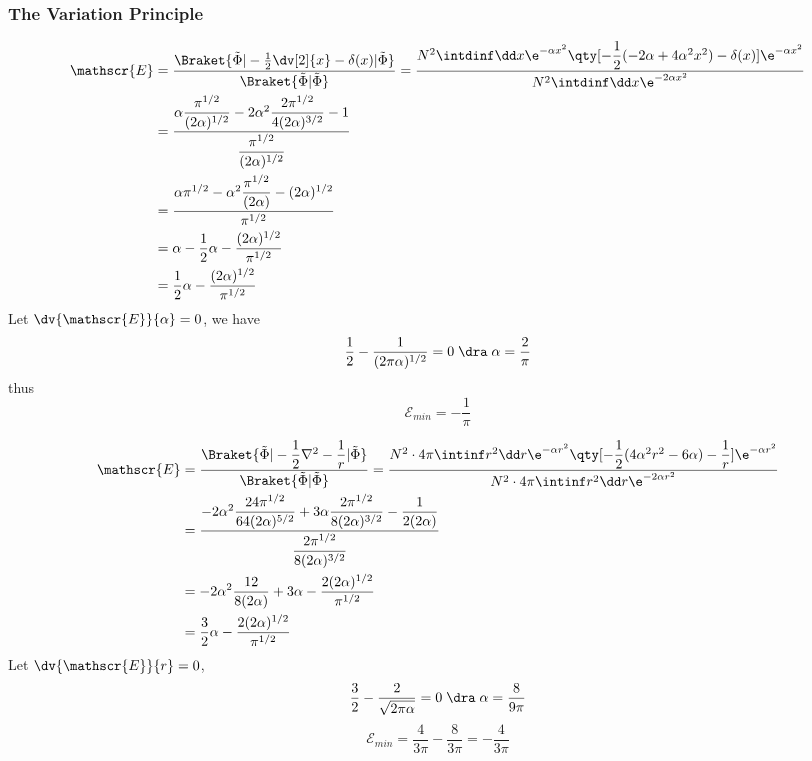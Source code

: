 \documentclass[a4paper]{article}
\begin{document}
\subsubsection{The Variation Principle}
\begin{equation}\label{key}
\begin{aligned}
\mathscr{E} &= \dfrac{\Braket{\tilde{\Phi} | -\tfrac{1}{2}\dv[2]{x}-\delta(x) | \tilde{\Phi}}}{\Braket{\tilde{\Phi} | \tilde{\Phi}}} = \dfrac{N^2 \intdinf\dd x \e^{-\alpha x^2}\qty[-\dfrac{1}{2}(-2\alpha+4\alpha^2 x^2) - \delta(x)]\e^{-\alpha x^2}}{N^2\intdinf\dd x \e^{-2\alpha x^2}}\\
&= \dfrac{\alpha\dfrac{\pi^{1/2}}{(2\alpha)^{1/2}} - 2\alpha^2\dfrac{2\pi^{1/2}}{4(2\alpha)^{3/2}} - 1}{\dfrac{\pi^{1/2}}{(2\alpha)^{1/2}}}\\
&= \dfrac{\alpha \pi^{1/2} - \alpha^2\dfrac{\pi^{1/2}}{(2\alpha)} - (2\alpha)^{1/2}}{\pi^{1/2}}\\
&= \alpha - \dfrac{1}{2}\alpha - \dfrac{(2\alpha)^{1/2}}{\pi^{1/2}}\\
&= \dfrac{1}{2}\alpha - \dfrac{(2\alpha)^{1/2}}{\pi^{1/2}}
\end{aligned}
\end{equation}
Let $ \dv{\mathscr{E}}{\alpha} = 0 $, we have
\begin{equation}\label{key}
\dfrac{1}{2} - \dfrac{1}{(2\pi\alpha)^{1/2}} = 0 \;\dra\; \alpha = \dfrac{2}{\pi}
\end{equation}
thus
\begin{equation}\label{key}
\mathscr{E}_{min} = -\dfrac{1}{\pi}
\end{equation}

\begin{equation}\label{key}
\begin{aligned}
\mathscr{E} &= \dfrac{\Braket{\tilde{\Phi} | -\dfrac{1}{2}\nabla^2 - \dfrac{1}{r} | \tilde{\Phi}}}{\Braket{\tilde{\Phi} | \tilde{\Phi}}} = \dfrac{N^2 \cdot 4\pi \intinf r^2\dd r \e^{-\alpha r^2}\qty[-\dfrac{1}{2}(4 \alpha^2 r^2 - 6\alpha ) - \dfrac{1}{r}]\e^{-\alpha r^2}}{N^2\cdot 4\pi \intinf r^2\dd r \e^{-2\alpha r^2}}\\
&= \dfrac{-2\alpha^2\dfrac{24\pi^{1/2}}{64(2\alpha)^{5/2}} + 3\alpha\dfrac{2\pi^{1/2}}{8(2\alpha)^{3/2}} - \dfrac{1}{2(2\alpha)} }{\dfrac{2\pi^{1/2}}{8(2\alpha)^{3/2}}}\\
&= -2\alpha^2\dfrac{12}{8(2\alpha)} + 3\alpha - \dfrac{2(2\alpha)^{1/2}}{\pi^{1/2} } \\
&= \dfrac{3}{2}\alpha - \dfrac{2(2\alpha)^{1/2}}{\pi^{1/2} }
\end{aligned}
\end{equation}
Let $ \dv{\mathscr{E}}{r} = 0 $,
\begin{equation}\label{key}
\dfrac{3}{2} - \dfrac{2}{\sqrt{2\pi\alpha}} = 0 \;\dra\; \alpha = \dfrac{8}{9\pi}
\end{equation}
\begin{equation}\label{key}
\mathscr{E}_{min} = \dfrac{4}{3\pi} - \dfrac{8}{3\pi} = -\dfrac{4}{3\pi}
\end{equation}
\end{document}
